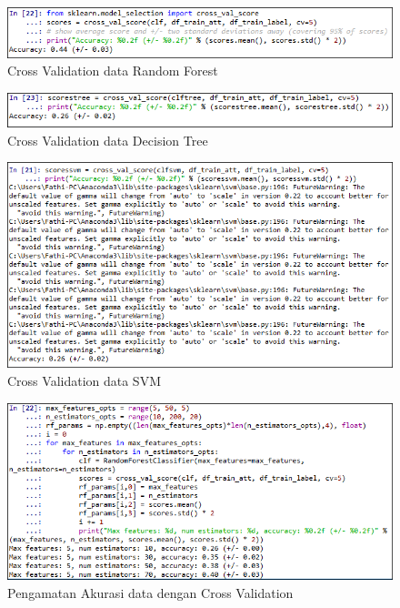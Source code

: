 \begin{figure}[ht]
	\centerline{\includegraphics[width=1\textwidth]{figures/fathi/chapter3/hari2/8.png}}
	\caption{Cross Validation data Random Forest}
	\label{p5}
\end{figure}

\begin{figure}[ht]
	\centerline{\includegraphics[width=1\textwidth]{figures/fathi/chapter3/hari2/9.png}}
	\caption{Cross Validation data Decision Tree}
	\label{p6}
\end{figure}

\begin{figure}[ht]
	\centerline{\includegraphics[width=1\textwidth]{figures/fathi/chapter3/hari2/10.png}}
	\caption{Cross Validation data SVM}
	\label{p7}
\end{figure}

\begin{figure}[ht]
	\centerline{\includegraphics[width=1\textwidth]{figures/fathi/chapter3/hari2/11.png}}
	\caption{Pengamatan Akurasi data dengan Cross Validation}
	\label{p8}
\end{figure}

